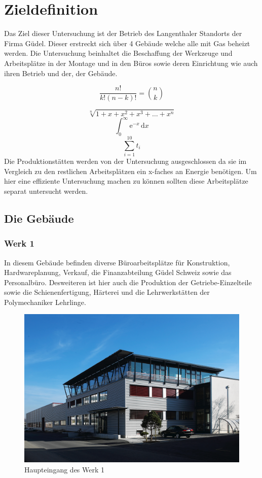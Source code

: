 \section{Zieldefinition}
Das Ziel dieser Untersuchung ist der Betrieb des Langenthaler Standorts der 
Firma Güdel. Dieser erstreckt sich über 4 Gebäude welche alle mit Gas beheizt
werden. Die Untersuchung beinhaltet die Beschaffung der Werkzeuge und 
Arbeitsplätze in der Montage und in den Büros sowie deren Einrichtung wie auch 
ihren Betrieb und der, der Gebäude.

\[\frac{n!}{k!(n-k)!} = \binom{n}{k}\]

\[\sqrt[n]{1+x+x^2+x^3+\dots+x^n}\]
\[\int_0^\infty \mathrm{e}^{-x}\,\mathrm{d}x\]
\[\displaystyle\sum_{i=1}^{10} t_i\]
Die Produktionstätten werden
von der Untersuchung ausgeschlossen da sie im Vergleich zu den restlichen
Arbeitsplätzen ein x-faches an Energie benötigen. Um hier eine effiziente
Untersuchung machen zu können sollten diese Arbeitsplätze separat untersucht
werden.
\newpage
\subsection{Die Gebäude}
\subsubsection{Werk 1}
In diesem Gebäude befinden diverse Büroarbeitsplätze für Konstruktion,
Hardwareplanung, Verkauf, die Finanzabteilung Güdel Schweiz sowie das 
Personalbüro. Desweiteren ist hier auch die Produktion der Getriebe-Einzelteile 
sowie die Schienenfertigung, Härterei und die Lehrwerkstätten der Polymechaniker
Lehrlinge.
\begin{figure}[ht]
    \centering
    \includegraphics[scale=0.75]{werk_1.jpg}
    \caption{Haupteingang des Werk 1}
\end{figure}
\newpage
